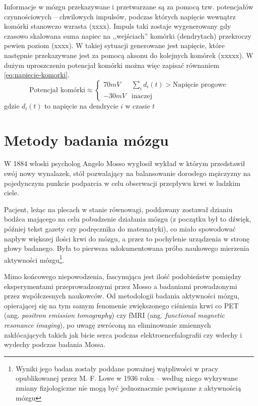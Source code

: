 \documentclass{./assets/wfis}
\begin{document}
Informacje w mózgu przekazywane i przetwarzane są za pomocą tzw. potencjałów czynnościowych – chwilowych impulsów, podczas których napięcie wewnątrz komórki stanowczo wzrasta (xxxx). Impuls taki zostaje wygenerowany gdy czasowo skalowana suma napiec na ,,wejściach'' komórki (dendrytach) przekroczy pewien poziom (xxxx). W takiej sytuacji generowane jest napięcie, które następnie przekazywane jest za pomocą aksonu do kolejnych komórek (xxxxx). W dużym uproszczeniu potencjał komórki można więc zapisać równaniem \ref{eq:napiecie-komorki}.
\begin{equation}\label{eq:napiecie-komorki}
    \text{Potencjał komórki} \approx 
    \begin{cases} 
      70mV & \sum_i d_i(t) > \text{Napięcie progowe}  \\
      -30mV &  \text{inaczej}
   \end{cases}
\end{equation}
gdzie $d_i(t)$ to napięcie na dendrycie $i$ w czasie $t$


\section{Metody badania mózgu}
W 1884 włoski psycholog Angelo Mosso wygłosił wykład \cite{sandrone_weighing_2014} w którym przedstawił swój nowy wynalazek, stół pozwalający na balansowanie dorosłego mężczyzny na pojedynczym punkcie podparcia w celu obserwacji przepływu krwi w ludzkim ciele. 

Pacjent, leżąc na plecach w stanie równowagi, poddawany zostawał dzianiu bodźca mającego na celu pobudzenie działania mózgu (z początku był to dźwięk, później tekst gazety czy podręcznika do matematyki\cite{sandrone_weighing_2014}), co miało spowodować napływ większej ilości krwi do mózgu, a przez to pochylenie urządzenia w stronę głowy badanego. Była to pierwsza udokumentowana próba naukowego mierzenia aktywności mózgu\footnote{Wyniki jego badan zostały poddane poważnej wątpliwości w pracy opublikowanej przez M. F. Lowe \cite{lowe_application_1936} w 1936 roku – według niego wykrywane zmiany fizjologiczne nie mogą być jednoznacznie powiązane z aktywnością mózgu}.

Mimo końcowego niepowodzenia, fascynująca jest ilość podobieństw pomiędzy eksperymentami przeprowadzonymi przez Mosso a badaniami prowadzonymi przez współczesnych naukowców. Od metodologii badania aktywności mózgu, opierającej się na tym samym fenomenie zwiększonego ciśnienia krwi co PET (ang. \textit{positron emission tomography}) czy fMRI (ang. \textit{functional magnetic resonance imaging}), po uwagę zwróconą na eliminowanie zmiennych zakłócających takich jak bicie serca podczas elektroencefalografii czy wdechy i wydechy podczas badania Mossa.
\end{document}
